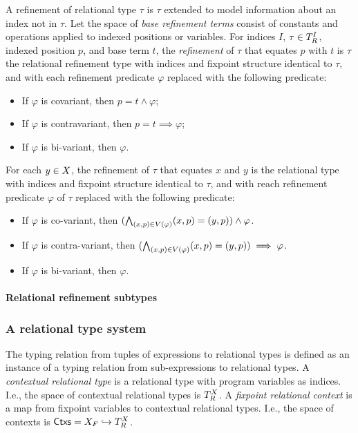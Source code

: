 A refinement of relational type $\tau$ is $\tau$ extended to model
information about an index not in $\tau$.
%
Let the space of \emph{base refinement terms} consist of constants and
operations applied to indexed positions or variables.
%
For indices $I$, $\tau \in T_{R}^{I}$, indexed position $p$, and
base term $t$, the \emph{refinement} of $\tau$ that equates $p$ with
$t$ is $\tau$ the relational refinement type with indices and fixpoint
structure identical to $\tau$, and with each refinement predicate
$\varphi$ replaced with the following predicate:
%
\begin{itemize}
\item %
  If $\varphi$ is covariant, then $p = t \land \varphi$;
\item %
  If $\varphi$ is contravariant, then $p = t \implies \varphi$;
\item %
  If $\varphi$ is bi-variant, then $\varphi$.
\end{itemize}
%
For each $y \in X$, the refinement of $\tau$ that equates $x$ and
$y$ is the relational type with indices and fixpoint structure
identical to $\tau$, and with reach refinement predicate $\varphi$ of
$\tau$ replaced with the following predicate:
%
\begin{itemize}
\item %
  If $\varphi$ is co-variant, then
  $(\bigwedge_{(x, p) \in V(\varphi)} (x, p) = (y, p)) \land \varphi$.
\item %
  If $\varphi$ is contra-variant, then
  $(\bigwedge_{(x, p) \in V(\varphi)} (x, p) = (y, p)) \implies \varphi$.
\item %
  If $\varphi$ is bi-variant, then $\varphi$.
\end{itemize}

\paragraph{Relational refinement subtypes}
%

\subsubsection{A relational type system}
\label{sec:rel-type-sys}
%
The typing relation from tuples of expressions to relational types is
defined as an instance of a typing relation from sub-expressions to
relational types.
A \emph{contextual relational type} is a relational type with program
variables as indices.
%
I.e., the space of contextual relational types is $T_{R}^{X}$.
%
A \emph{fixpoint relational context} is a map from fixpoint variables
to contextual relational types.
%
I.e., the space of contexts is
$\mathsf{Ctxs} = X_F \hookrightarrow T_R^{X}$.

